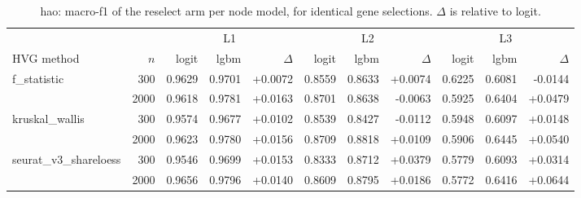 \begin{table}[t]
\centering
\small
\begin{tabular}{lrrrrrrrrrr}
\toprule
 &  & \multicolumn{3}{c}{L1} & \multicolumn{3}{c}{L2} & \multicolumn{3}{c}{L3} \\
\cmidrule(lr){3-5}\cmidrule(lr){6-8}\cmidrule(lr){9-11}
HVG method & $n$ & logit & lgbm & $\Delta$ & logit & lgbm & $\Delta$ & logit & lgbm & $\Delta$ \\
\midrule
f\_statistic & 300 & 0.9629 & 0.9701 & +0.0072 & 0.8559 & 0.8633 & +0.0074 & 0.6225 & 0.6081 & -0.0144 \\
 & 2000 & 0.9618 & 0.9781 & +0.0163 & 0.8701 & 0.8638 & -0.0063 & 0.5925 & 0.6404 & +0.0479 \\
\addlinespace
kruskal\_wallis & 300 & 0.9574 & 0.9677 & +0.0102 & 0.8539 & 0.8427 & -0.0112 & 0.5948 & 0.6097 & +0.0148 \\
 & 2000 & 0.9623 & 0.9780 & +0.0156 & 0.8709 & 0.8818 & +0.0109 & 0.5906 & 0.6445 & +0.0540 \\
\addlinespace
seurat\_v3\_shareloess & 300 & 0.9546 & 0.9699 & +0.0153 & 0.8333 & 0.8712 & +0.0379 & 0.5779 & 0.6093 & +0.0314 \\
 & 2000 & 0.9656 & 0.9796 & +0.0140 & 0.8609 & 0.8795 & +0.0186 & 0.5772 & 0.6416 & +0.0644 \\
\bottomrule
\end{tabular}
\caption{hao: macro-f1 of the reselect arm per node model, for identical gene selections. $\Delta$ is relative to logit.}
\label{tab:backend-hao-macrof1}
\end{table}
